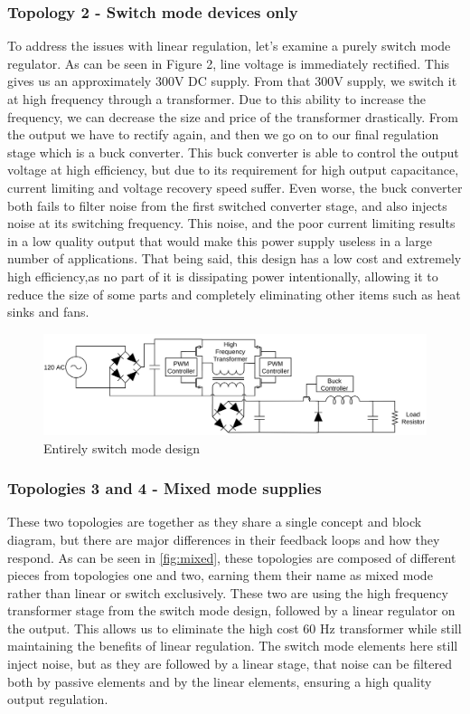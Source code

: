 \documentclass{article}
\begin{document}
\subsubsection{Topology 2 - Switch mode devices only}
To address the issues with linear regulation, let's examine a purely switch mode 
regulator. As can be seen in Figure 2, line voltage is immediately rectified. 
This gives us an approximately 300V DC supply. From that 300V supply, we switch 
it at high frequency through a transformer. Due to this ability to increase the 
frequency, we can decrease the size and price of the transformer drastically. From 
the output we have to rectify again, and then we go on to our final regulation stage 
which is a buck converter. This buck converter is able to control the output voltage 
at high efficiency, but due to its requirement for high output capacitance, current 
limiting and voltage recovery speed suffer. Even worse, the buck converter both 
fails to filter noise from the first switched converter stage, and also injects 
noise at its switching frequency. This noise, and the poor current limiting results 
in a low quality output that would make this power supply useless in a large number 
of applications. That being said, this design has a low cost and extremely high 
efficiency,as no part of it is dissipating power intentionally, allowing it to 
reduce the size of some parts and completely eliminating other items such as heat 
sinks and fans.

\begin{figure}[H]
    \includegraphics[width=\textwidth]{switched}
    \caption{Entirely switch mode design}
    \label{fig:switched}
\end{figure}
\subsubsection{Topologies 3 and 4 - Mixed mode supplies}

These two topologies are together as they share a single concept and block diagram, 
but there are major differences in their feedback loops and how they respond. 
As can be seen in \autoref{fig:mixed}, these topologies are composed of different pieces 
from topologies one and two, earning them their name as mixed mode rather than 
linear or switch exclusively. These two are using the high frequency transformer 
stage from the switch mode design, followed by a linear regulator on the output. 
This allows us to eliminate the high cost 60 Hz transformer while still maintaining 
the benefits of linear regulation. The switch mode elements here still inject noise, 
but as they are followed by a linear stage, that noise can be filtered both by passive 
elements and by the linear elements, ensuring a high quality output regulation.  
\end{document}
